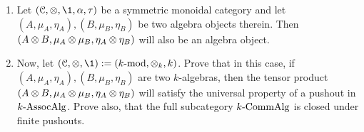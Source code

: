         \begin{question} \label{question: tensor_products_of_algebras_in_symmetric_monoidal_categories}
            \begin{enumerate}
                \item Let $(\C, \tensor, \1, \alpha, \tau)$ be a symmetric monoidal category and let $(A, \mu_A, \eta_A), (B, \mu_B, \eta_B)$ be two algebra objects therein. Then $(A \tensor B, \mu_A \tensor \mu_B, \eta_A \tensor \eta_B)$ will also be an algebra object.
                \item Now, let $(\C, \tensor, \1) := (k\mod, \tensor_k, k)$. Prove that in this case, if $(A, \mu_A, \eta_A), (B, \mu_B, \eta_B)$ are two $k$-algebras, then the tensor product $(A \tensor B, \mu_A \tensor \mu_B, \eta_A \tensor \eta_B)$ will satisfy the universal property of a pushout in $k\text{-}\mathrm{Assoc}\mathrm{Alg}$. Prove also, that the full subcategory $k\text{-}\mathrm{Comm}\mathrm{Alg}$ is closed under finite pushouts.
            \end{enumerate}
        \end{question}

